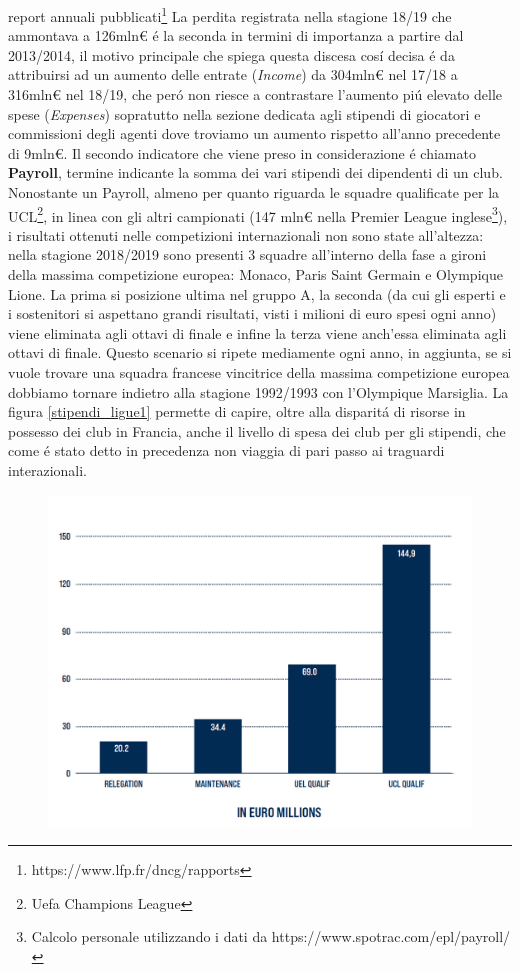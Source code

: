 \documentclass[
    corpo=12pt,
    oneside,
    evenboxes,
    tipotesi=triennale,
    stile=classica,
    oldstyle,
    autoretitolo,
    greek,
]{toptesi}
\begin{document}
\begin{interlinea}{1.5}
report annuali pubblicati\footnote{https://www.lfp.fr/dncg/rapports} \newline 
La perdita registrata nella stagione 18/19 che ammontava a 126mln€ \'e la seconda in termini di importanza a partire dal 2013/2014,
il motivo principale che spiega questa discesa cos\'i decisa \'e da attribuirsi ad un aumento delle entrate (\emph{Income})
da 304mln€ nel 17/18 a 316mln€ nel 18/19, che per\'o non riesce a contrastare l'aumento pi\'u elevato
delle spese (\emph{Expenses}) sopratutto nella sezione dedicata agli stipendi di giocatori e commissioni degli agenti 
dove troviamo un aumento rispetto all'anno precedente di 9mln€.\newline
Il secondo indicatore che viene preso in considerazione \'e chiamato \textbf{Payroll}, termine indicante la somma dei vari stipendi
dei dipendenti di un club. Nonostante un Payroll, almeno per quanto riguarda le squadre qualificate per la UCL\footnote{Uefa Champions League}, in linea con gli
altri campionati (147 mln€ nella Premier League inglese\footnote{Calcolo personale utilizzando i dati da https://www.spotrac.com/epl/payroll/}),
i risultati ottenuti nelle competizioni internazionali non sono state all'altezza: nella stagione 2018/2019 sono presenti 3 squadre 
all'interno della fase a gironi della massima competizione europea: Monaco, Paris Saint Germain e Olympique Lione. La prima si 
posizione ultima nel gruppo A, la seconda (da cui gli esperti e i sostenitori si aspettano grandi risultati, visti i milioni di euro 
spesi ogni anno) viene eliminata agli ottavi di finale e infine la terza viene anch'essa eliminata agli ottavi di finale. Questo scenario
si ripete mediamente ogni anno, in aggiunta, se si vuole trovare una squadra francese vincitrice della massima competizione europea 
dobbiamo tornare indietro alla stagione 1992/1993 con l'Olympique Marsiglia. La figura \ref{stipendi_ligue1} permette di capire, 
oltre alla disparit\'a di risorse in possesso dei club in Francia, anche il livello di spesa dei club per gli stipendi, che come \'e stato detto in precedenza non viaggia 
di pari passo ai traguardi interazionali.\newline
\begin{figure}
    \centering
    \includegraphics[scale=0.5]{img/stipendi_ligue1.png}

\end{figure}
\end{interlinea}
\end{document}
